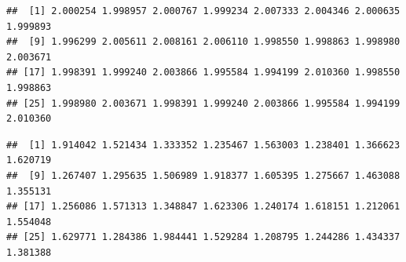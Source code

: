 \documentclass[
]{krantz}
\makeatletter
\newenvironment{Shaded}{\begin{snugshade}}{\end{snugshade}}
\newcommand{\AttributeTok}[1]{\textcolor[rgb]{0.77,0.63,0.00}{#1}}
\newcommand{\CommentTok}[1]{\textcolor[rgb]{0.56,0.35,0.01}{\textit{#1}}}
\newcommand{\DecValTok}[1]{\textcolor[rgb]{0.00,0.00,0.81}{#1}}
\newcommand{\FloatTok}[1]{\textcolor[rgb]{0.00,0.00,0.81}{#1}}
\newcommand{\FunctionTok}[1]{\textcolor[rgb]{0.00,0.00,0.00}{#1}}
\newcommand{\NormalTok}[1]{#1}
\newcommand{\OtherTok}[1]{\textcolor[rgb]{0.56,0.35,0.01}{#1}}
\newcommand{\SpecialCharTok}[1]{\textcolor[rgb]{0.00,0.00,0.00}{#1}}
\newcommand{\StringTok}[1]{\textcolor[rgb]{0.31,0.60,0.02}{#1}}
\newenvironment{kframe}{%
\medskip{}
\setlength{\fboxsep}{.8em}
 \def\at@end@of@kframe{}%
 \ifinner\ifhmode%
  \def\at@end@of@kframe{\end{minipage}}%
  \begin{minipage}{\columnwidth}%
 \fi\fi%
 \def\FrameCommand##1{\hskip\@totalleftmargin \hskip-\fboxsep
 \colorbox{shadecolor}{##1}\hskip-\fboxsep
     \hskip-\linewidth \hskip-\@totalleftmargin \hskip\columnwidth}%
 \MakeFramed {\advance\hsize-\width
   \@totalleftmargin\z@ \linewidth\hsize
   \@setminipage}}%
 {\par\unskip\endMakeFramed%
 \at@end@of@kframe}
\renewenvironment{Shaded}{\begin{kframe}}{\end{kframe}}
\makeatother
\begin{document}
\begin{Shaded}
\end{Shaded}

\begin{verbatim}
##  [1] 2.000254 1.998957 2.000767 1.999234 2.007333 2.004346 2.000635 1.999893
##  [9] 1.996299 2.005611 2.008161 2.006110 1.998550 1.998863 1.998980 2.003671
## [17] 1.998391 1.999240 2.003866 1.995584 1.994199 2.010360 1.998550 1.998863
## [25] 1.998980 2.003671 1.998391 1.999240 2.003866 1.995584 1.994199 2.010360
\end{verbatim}

\begin{Shaded}
\end{Shaded}

\begin{verbatim}
##  [1] 1.914042 1.521434 1.333352 1.235467 1.563003 1.238401 1.366623 1.620719
##  [9] 1.267407 1.295635 1.506989 1.918377 1.605395 1.275667 1.463088 1.355131
## [17] 1.256086 1.571313 1.348847 1.623306 1.240174 1.618151 1.212061 1.554048
## [25] 1.629771 1.284386 1.984441 1.529284 1.208795 1.244286 1.434337 1.381388
\end{verbatim}
\end{document}
